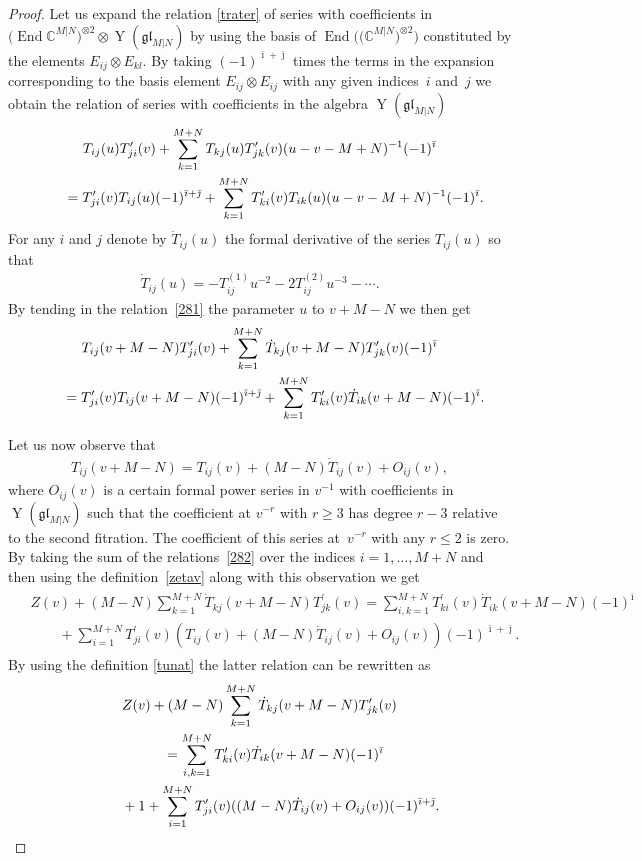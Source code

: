 \documentclass[pdftex]{sigma}
\numberwithin{equation}{section}
\def\1{^{-1}}
\def\bi{{\bar\imath }}
\def\bj{{\bar\jmath }}
\def\CC{{\mathbb{C}}}
\def\CMN{\CC^{M|N}}
\def\End{\operatorname{End}}
\def\ge{\geqslant}
\def\glMN{\mathfrak{gl}_{M|N}}
\def\le{\leqslant}
\def\ot{\otimes}
\def\TD{\dot{T}}
\def\TP{T^{\prime}}
\def\YMN{\operatorname{Y}(\glMN)}
\begin{document}
\begin{proof}
Let us expand the relation \eqref{trater} of series with
coefficients in $\big(\End\CMN\big)^{\ot 2}\ot\YMN$ by using
the basis of $\End\big(\big(\CMN\big)^{\ot 2}\big)$ constituted by the
elements $E_{ij}\ot E_{kl} $.
By taking $(-1)^{\bi+ \bj}$ times the terms in the expansion
corresponding to the basis element $E_{ij}\ot E_{ij}$
with any given indices~$i$ and~$j$ we obtain the relation of series
with coefficients in the algebra $\YMN$
\begin{gather}\notag
T_{ij}(u) \TP_{ji}(v)+
\sum_{k=1}^{M+N}
T_{kj}(u) \TP_{jk}(v) (u-v-M+N)\1 (-1)^{\bi}\\
\qquad{} =
\TP_{ji}(v) T_{ij}(u) (-1)^{\bi+ \bj}+
\sum_{k=1}^{M+N}
\TP_{ki}(v) T_{ik}(u) (u-v-M+N)\1(-1)^{\bi} .\label{281}
\end{gather}
For any $i$ and $j$ denote by $\TD_{ij}(u)$
the formal derivative of the series $T_{ij}(u)$ so that
\begin{gather}\label{TD}
\TD_{ij}(u)=- T^{(1)}_{ij}u^{-2}-2 T^{(2)}_{ij}u^{-3}-\cdots .
\end{gather}
By tending in the relation~\eqref{281} the parameter $u$ to $v+M-N$
we then get
\begin{gather}\notag
T_{ij}(v+M-N) \TP_{ji}(v)+
\sum_{k=1}^{M+N}
\TD_{kj}(v+M-N) \TP_{jk}(v) (-1)^{\bi}\\
\qquad{} =
\TP_{ji}(v) T_{ij}(v+M-N) (-1)^{\bi+ \bj}+
\sum_{k=1}^{M+N}
\TP_{ki}(v) \TD_{ik}(v+M-N) (-1)^{\bi} .\label{282}
\end{gather}

Let us now observe that
\begin{gather*}
T_{ij}(v+M-N)=T_{ij}(v)+(M-N) \TD_{ij}(v)+O_{ij}(v),
\end{gather*}
where $O_{ij}(v)$
is a certain formal power series in $v\1$ with coefficients in $\YMN$
such that the coefficient at $v^{-r}$ with $r\ge3$
has degree $r-3$ relative to the second fitration.
The coefficient of this series at~$v^{-r}$ with any $r\le2$ is zero.
By taking the sum of the relations~\eqref{282} over the indices
$i=1,\dots, M+N$ and then using the definition~\eqref{zetav}
along with this observation we get
\begin{gather*}\begin{split}&
 Z(v)+(M-N)\sum_{k=1}^{M+N}\TD_{kj}(v+M-N) \TP_{jk}(v)
 =
\sum_{i,k=1}^{M+N}
\TP_{ki}(v) \TD_{ik}(v+M-N) (-1)^{\bi}\\
& \qquad{} + \sum_{i=1}^{M+N}\TP_{ji}(v)(T_{ij}(v)+(M-N) \TD_{ij}(v)+O_{ij}(v)) (-1)^{\bi+ \bj} .
\end{split}
\end{gather*}
By using the definition \eqref{tunat} the latter relation can be rewritten as
\begin{gather}
\notag
Z(v)+(M-N)\sum_{k=1}^{M+N}\TD_{kj}(v+M-N) \TP_{jk}(v)\\
\qquad {} =\sum_{i,k=1}^{M+N}\TP_{ki}(v) \TD_{ik}(v+M-N) (-1)^{\bi}\nonumber\\
\qquad\quad{} +
1+\sum_{i=1}^{M+N}
\TP_{ji}(v) ((M-N) \TD_{ij}(v)+O_{ij}(v)) (-1)^{\bi+ \bj} .\label{283}
\end{gather}


\end{proof}
\end{document}
